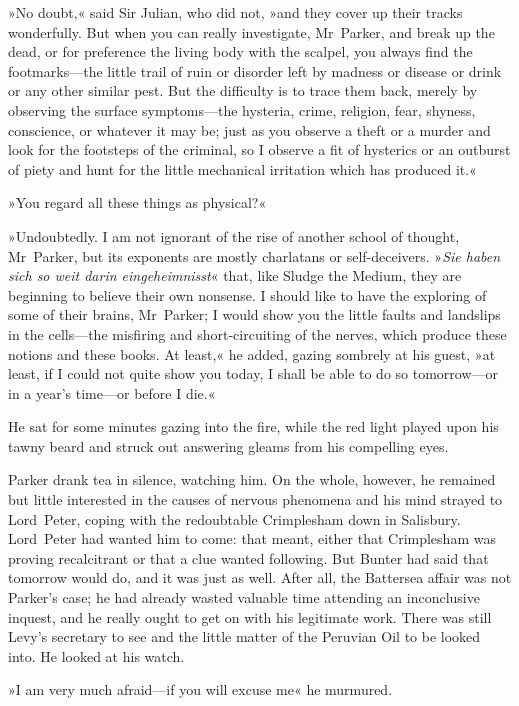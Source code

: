 »No doubt,« said Sir Julian, who did not, »and they cover up their tracks wonderfully. But when you can really investigate, Mr~Parker, and break up the dead, or for preference the living body with the scalpel, you always find the footmarks—the little trail of ruin or disorder left by madness or disease or drink or any other similar pest. But the difficulty is to trace them back, merely by observing the surface symptoms—the hysteria, crime, religion, fear, shyness, conscience, or whatever it may be; just as you observe a theft or a murder and look for the footsteps of the criminal, so I observe a fit of hysterics or an outburst of piety and hunt for the little mechanical irritation which has produced it.«

»You regard all these things as physical?«

»Undoubtedly. I am not ignorant of the rise of another school of thought, Mr~Parker, but its exponents are mostly charlatans or self-deceivers. »\textit{Sie haben sich so weit darin eingeheimnisst}« that, like Sludge the Medium, they are beginning to believe their own nonsense. I should like to have the exploring of some of their brains, Mr~Parker; I would show you the little faults and landslips in the cells—the misfiring and short-circuiting of the nerves, which produce these notions and these books. At least,« he added, gazing sombrely at his guest, »at least, if I could not quite show you today, I shall be able to do so tomorrow—or in a year's time—or before I die.«

He sat for some minutes gazing into the fire, while the red light played upon his tawny beard and struck out answering gleams from his compelling eyes.

Parker drank tea in silence, watching him. On the whole, however, he remained but little interested in the causes of nervous phenomena and his mind strayed to Lord~Peter, coping with the redoubtable Crimplesham down in Salisbury. Lord~Peter had wanted him to come: that meant, either that Crimplesham was proving recalcitrant or that a clue wanted following. But Bunter had said that tomorrow would do, and it was just as well. After all, the Battersea affair was not Parker's case; he had already wasted valuable time attending an inconclusive inquest, and he really ought to get on with his legitimate work. There was still Levy's secretary to see and the little matter of the Peruvian Oil to be looked into. He looked at his watch.

»I am very much afraid—if you will excuse me\longdash« he murmured.

